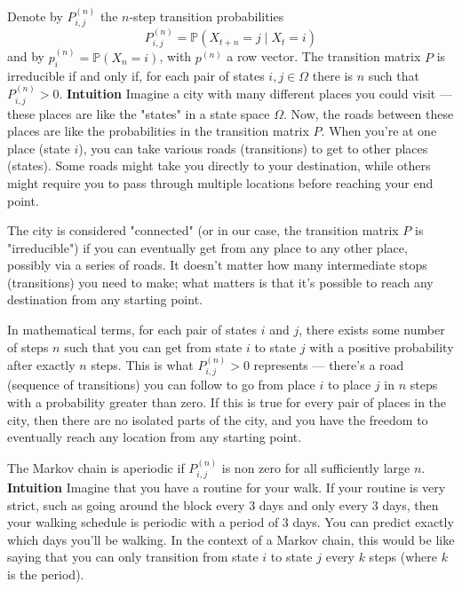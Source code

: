 \documentclass{article}
\begin{document}
Denote by $P_{i, j}^{(n)}$ the $n$-step transition probabilities
$$
P_{i, j}^{(n)}=\mathbb{P}\left(X_{t+n}=j \mid X_t=i\right)
$$
and by $p_i^{(n)}=\mathbb{P}\left(X_n=i\right)$, with $p^{(n)}$ a row vector.
The transition matrix $P$ is irreducible if and only if, for each pair of states $i, j \in \Omega$ there is $n$ such that $P_{i, j}^{(n)}>0$. 
\newline
\textbf{Intuition} \newline
Imagine a city with many different places you could visit — these places are like the "states" in a state space \( \Omega \). Now, the roads between these places are like the probabilities in the transition matrix \( P \). When you're at one place (state \( i \)), you can take various roads (transitions) to get to other places (states). Some roads might take you directly to your destination, while others might require you to pass through multiple locations before reaching your end point.

The city is considered "connected" (or in our case, the transition matrix \( P \) is "irreducible") if you can eventually get from any place to any other place, possibly via a series of roads. It doesn't matter how many intermediate stops (transitions) you need to make; what matters is that it's possible to reach any destination from any starting point. 

In mathematical terms, for each pair of states \( i \) and \( j \), there exists some number of steps \( n \) such that you can get from state \( i \) to state \( j \) with a positive probability after exactly \( n \) steps. This is what \( P_{i, j}^{(n)}>0 \) represents — there's a road (sequence of transitions) you can follow to go from place \( i \) to place \( j \) in \( n \) steps with a probability greater than zero. If this is true for every pair of places in the city, then there are no isolated parts of the city, and you have the freedom to eventually reach any location from any starting point.


The Markov chain is aperiodic if $P_{i, j}^{(n)}$ is non zero for all sufficiently large $n$.
\newline
\textbf{Intuition} \newline
Imagine that you have a routine for your walk. If your routine is very strict, such as going around the block every 3 days and only every 3 days, then your walking schedule is periodic with a period of 3 days. You can predict exactly which days you'll be walking. In the context of a Markov chain, this would be like saying that you can only transition from state \( i \) to state \( j \) every \( k \) steps (where \( k \) is the period).
\end{document}
